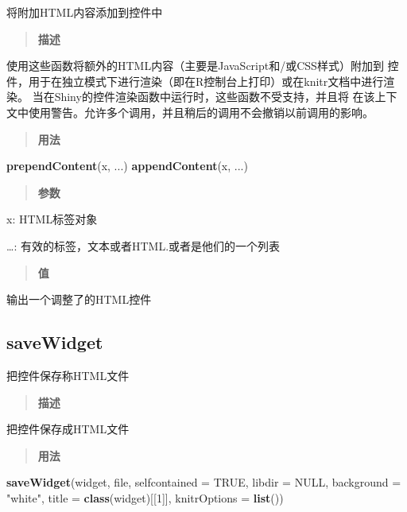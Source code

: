 \documentclass[]{book}
\newenvironment{Shaded}{\begin{snugshade}}{\end{snugshade}}
\newcommand{\KeywordTok}[1]{\textcolor[rgb]{0.13,0.29,0.53}{\textbf{#1}}}
\newcommand{\DataTypeTok}[1]{\textcolor[rgb]{0.13,0.29,0.53}{#1}}
\newcommand{\DecValTok}[1]{\textcolor[rgb]{0.00,0.00,0.81}{#1}}
\newcommand{\StringTok}[1]{\textcolor[rgb]{0.31,0.60,0.02}{#1}}
\newcommand{\OtherTok}[1]{\textcolor[rgb]{0.56,0.35,0.01}{#1}}
\newcommand{\NormalTok}[1]{#1}
\theoremstyle{definition}
\theoremstyle{definition}
\theoremstyle{definition}
\theoremstyle{remark}
\begin{document}
将附加HTML内容添加到控件中

\begin{quote}
\textbf{描述}
\end{quote}

使用这些函数将额外的HTML内容（主要是JavaScript和/或CSS样式）附加到
控件，用于在独立模式下进行渲染（即在R控制台上打印）或在knitr文档中进行渲染。
当在Shiny的控件渲染函数中运行时，这些函数不受支持，并且将
在该上下文中使用警告。允许多个调用，并且稍后的调用不会撤销以前调用的影响。

\begin{quote}
\textbf{用法}
\end{quote}

\begin{Shaded}
\begin{Highlighting}[]
\KeywordTok{prependContent}\NormalTok{(x, ...)}
\KeywordTok{appendContent}\NormalTok{(x, ...)}
\end{Highlighting}
\end{Shaded}

\begin{quote}
\textbf{参数}
\end{quote}

x: HTML标签对象

\ldots{}: 有效的标签，文本或者HTML.或者是他们的一个列表

\begin{quote}
\textbf{值}
\end{quote}

输出一个调整了的HTML控件

\subsection{saveWidget}\label{savewidget}

把控件保存称HTML文件

\begin{quote}
\textbf{描述}
\end{quote}

把控件保存成HTML文件

\begin{quote}
\textbf{用法}
\end{quote}

\begin{Shaded}
\begin{Highlighting}[]
\KeywordTok{saveWidget}\NormalTok{(widget, file, }\DataTypeTok{selfcontained =} \OtherTok{TRUE}\NormalTok{, }\DataTypeTok{libdir =} \OtherTok{NULL}\NormalTok{,}
  \DataTypeTok{background =} \StringTok{"white"}\NormalTok{, }\DataTypeTok{title =} \KeywordTok{class}\NormalTok{(widget)[[}\DecValTok{1}\NormalTok{]], }\DataTypeTok{knitrOptions =} \KeywordTok{list}\NormalTok{())}
\end{Highlighting}
\end{Shaded}
\end{document}
